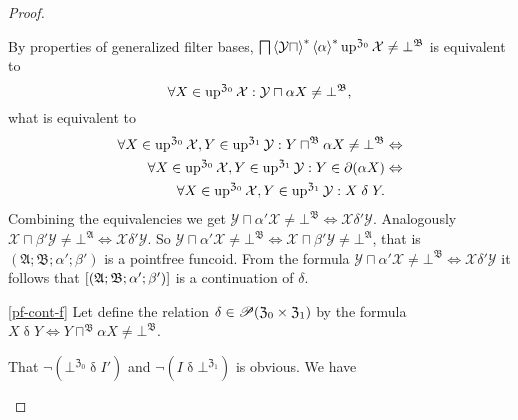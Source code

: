 \begin{proof}
\begin{widedisorder}
By properties of generalized filter bases, $\bigsqcap\left\langle \mathcal{Y}\sqcap\right\rangle ^{\ast}\left\langle \alpha\right\rangle ^{\ast}\operatorname{up}^{\mathfrak{Z}_{0}}\mathcal{X}\ne\bot^{\mathfrak{B}}$
is equivalent to
\[
\forall X\in\operatorname{up}^{\mathfrak{Z}_{0}}\mathcal{X}:\mathcal{Y}\sqcap\alpha X\ne\bot^{\mathfrak{B}},
\]
what is equivalent to
\begin{align*}
\forall X\in\operatorname{up}^{\mathfrak{Z}_{0}}\mathcal{X},Y\in\operatorname{up}^{\mathfrak{Z}_{1}}\mathcal{Y}:Y\sqcap^{\mathfrak{B}}\alpha X\ne\bot^{\mathfrak{B}} & \Leftrightarrow\\
\forall X\in\operatorname{up}^{\mathfrak{Z}_{0}}\mathcal{X},Y\in\operatorname{up}^{\mathfrak{Z}_{1}}\mathcal{Y}:Y\in\partial(\alpha X) & \Leftrightarrow\\
\forall X\in\operatorname{up}^{\mathfrak{Z}_{0}}\mathcal{X},Y\in\operatorname{up}^{\mathfrak{Z}_{1}}\mathcal{Y}:X\mathrel\delta Y.
\end{align*}
Combining the equivalencies we get $\mathcal{Y}\sqcap\alpha'\mathcal{X}\ne\bot^{\mathfrak{B}}\Leftrightarrow\mathcal{X}\mathrel{\delta'}\mathcal{Y}$.
Analogously $\mathcal{X}\sqcap\beta'\mathcal{Y}\ne\bot^{\mathfrak{A}}\Leftrightarrow\mathcal{X}\mathrel{\delta'}\mathcal{Y}$.
So $\mathcal{Y}\sqcap\alpha'\mathcal{X}\ne\bot^{\mathfrak{B}}\Leftrightarrow\mathcal{X}\sqcap\beta'\mathcal{Y}\ne\bot^{\mathfrak{A}}$,
that is $(\mathfrak{A};\mathfrak{B};\alpha';\beta')$ is a pointfree
funcoid. From the formula $\mathcal{Y}\sqcap\alpha'\mathcal{X}\ne\bot^{\mathfrak{B}}\Leftrightarrow\mathcal{X}\mathrel{\delta'}\mathcal{Y}$
it follows that $\mathrel{\left[(\mathfrak{A};\mathfrak{B};\alpha';\beta')\right]}$
is a continuation of $\delta$.

\item [{\ref{pf-cont-f}}] Let define the relation $\delta\in\mathscr{P}(\mathfrak{Z}_{0}\times\mathfrak{Z}_{1})$
by the formula $X\mathrel{\delta}Y\Leftrightarrow Y\sqcap^{\mathfrak{B}}\alpha X\neq\bot^{\mathfrak{B}}$.


That $\neg(\bot^{\mathfrak{Z}_{0}}\mathrel{\delta}I')$ and $\neg(I\mathrel{\delta}\bot^{\mathfrak{Z}_{1}})$
is obvious. We have



\end{widedisorder}
\end{proof}
